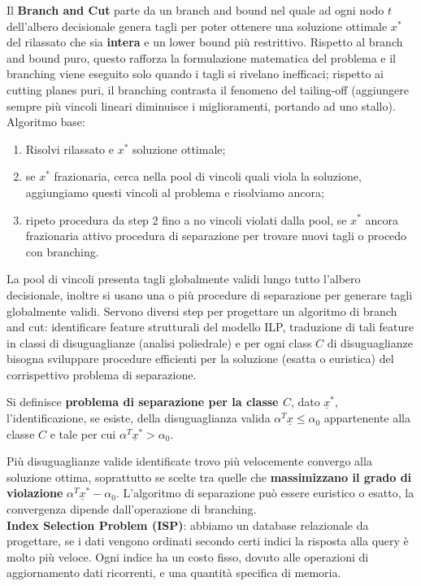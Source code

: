 Il \textbf{Branch and Cut} parte da un branch and bound nel quale ad ogni nodo $t$ dell'albero decisionale genera tagli per poter ottenere una soluzione ottimale $x^*$ del rilassato che sia \textbf{intera} e un lower bound più restrittivo. Rispetto al branch and bound puro, questo rafforza la formulazione matematica del problema e il branching viene eseguito solo quando i tagli si rivelano inefficaci; rispetto ai cutting planes puri, il branching contrasta il fenomeno del tailing-off (aggiungere sempre più vincoli lineari diminuisce i miglioramenti, portando ad uno stallo). Algoritmo base:
\begin{enumerate}
	\item Risolvi rilassato e $x^*$ soluzione ottimale;
	\item se $x^*$ frazionaria, cerca nella pool di vincoli quali viola la soluzione, aggiungiamo questi vincoli al problema e risolviamo ancora;
	\item ripeto procedura da step 2 fino a no vincoli violati dalla pool, se $x^*$ ancora frazionaria attivo procedura di separazione per trovare nuovi tagli o procedo con branching.
\end{enumerate}
La pool di vincoli presenta tagli globalmente validi lungo tutto l'albero decisionale, inoltre si usano una o più procedure di separazione per generare tagli globalmente validi. Servono diversi step per progettare un algoritmo di branch and cut: identificare feature strutturali del modello ILP, traduzione di tali feature in classi di disuguaglianze (analisi poliedrale) e per ogni class $C$ di disuguaglianze bisogna sviluppare procedure efficienti per la soluzione (esatta o euristica) del corrispettivo problema di separazione.

Si definisce \textbf{problema di separazione per la classe $C$}, dato $\underline{x}^*$, l'identificazione, se esiste, della disuguaglianza valida $\alpha^T\underline{x}\le \alpha_0$ appartenente alla classe $C$ e tale per cui $\alpha^T\underline{x}^*>\alpha_0$.

Più disuguaglianze valide identificate trovo più velocemente convergo alla soluzione ottima, soprattutto se scelte tra quelle che \textbf{massimizzano il grado di violazione} $\alpha^T\underline{x}^*-\alpha_0$. L'algoritmo di separazione può essere euristico o esatto, la convergenza dipende dall'operazione di branching.\\

\textbf{Index Selection Problem (ISP)}: abbiamo un database relazionale da progettare, se i dati vengono ordinati secondo certi indici la risposta alla query è molto più veloce. Ogni indice ha un costo fisso, dovuto alle operazioni di aggiornamento dati ricorrenti, e una quantità specifica di memoria.

